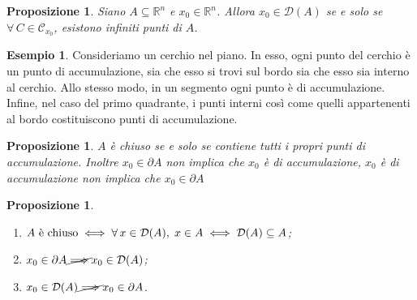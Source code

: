 \documentclass{article}
\theoremstyle{plain}
\newtheorem{prop}[thm]{Proposizione}
\theoremstyle{definition}
\newtheorem{exmp}{Esempio}[section]
\theoremstyle{remark}
\begin{document}
\vspace{10pt}

\begin{bxthm}
\begin{prop}
    Siano $A\subseteq\mathbb{R}^n$ e $x_0\in\mathbb{R}^n$.
    Allora $x_0\in\mathcal{D}(A)$ se e solo se $\forall\,C\in\mathcal{C}_{x_0}$, esistono infiniti punti di $A$.
\end{prop}
\end{bxthm}

\vspace{10pt}

\begin{exmp}
    Consideriamo un cerchio nel piano. In esso, ogni punto del cerchio è un punto di accumulazione, sia che esso si trovi sul bordo sia che esso sia interno al cerchio. 
    Allo stesso modo, in un segmento ogni punto è di accumulazione. 
    Infine, nel caso del primo quadrante, i punti interni così come quelli appartenenti al bordo costituiscono punti di accumulazione.
\end{exmp}

\vspace{10pt}

\begin{bxthm}
\begin{prop}
    $A$ è chiuso se e solo se contiene tutti i propri punti di accumulazione. 
    Inoltre $x_0\in\partial A$ non implica che $x_0$ è di accumulazione, $x_0$ è di accumulazione non implica che $x_0\in \partial A$
\end{prop}
\end{bxthm}

\vspace{10pt}

\begin{bxthm}
\begin{prop}\hfill
    \begin{enumerate}
        \item $A\textup{ è chiuso}\iff\forall\,x\in\mathcal{D}(A),\;x\in A\iff\mathcal{D}(A)\subseteq A$;
        \item $x_0\in\partial A\cancel{\implies}x_0\in\mathcal{D}(A)$;
        \item $x_0\in\mathcal{D}(A)\cancel{\implies}x_0\in\partial A$.
    \end{enumerate}
\end{prop}
\end{bxthm}

\vspace{10pt}
\end{document}
